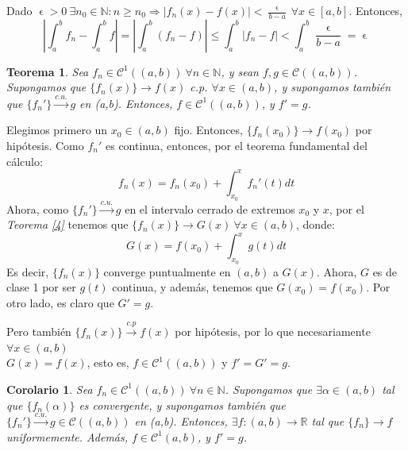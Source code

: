 \documentclass[11pt, a4paper]{article}
\makeatletter
\newif\IfInSansMode
\let\oldsf\sffamily
\renewcommand*{\sffamily}{\oldsf\mathversion{sans}\InSansModetrue}
\let\oldnorm\normalfont
\renewcommand*{\normalfont}{\oldnorm\InSansModefalse\mathversion{normal}}
\let\epsilon\upvarepsilon
\newcommand{\fn}{\{f_n\}}
\renewenvironment{proof}[1][\proofname] {\par\pushQED{\qed}\normalfont\topsep6\p@\@plus6\p@\relax\trivlist\item[\hskip\labelsep\itshape\sffamily#1\@addpunct{.}]\ignorespaces}{\popQED\endtrivlist\@endpefalse}
\theoremstyle{theorem-style}
\newtheorem{nth}{Teorema}[section]
\newtheorem{ncor}{Corolario}[section]
\theoremstyle{definition-style}
\theoremstyle{remark-style}
\theoremstyle{example-style}
\makeatother
\begin{document}
  \begin{proof} Dado $\displaystyle \epsilon >0\ \exists n_0 \in \mathbb{N}: n \ge n_0 \Rightarrow |f_n(x)-f(x)| < \frac{\epsilon}{b-a}\ \forall x \in [a,b]$. Entonces, $$\left| \int_a^b f_n - \int _a^b f \right| = \left| \int_a^b (f_n - f) \right| \le \int_a^b |f_n - f| < \int_a^b \frac{\epsilon}{b-a} = \epsilon$$
  \end{proof}

\begin{nth} \label{5}
  Sea $f_n\in \mathcal{C}^1((a,b)) \ \forall n \in \mathbb{N}$, y sean $f,g \in \mathcal{C}((a,b))$. Supongamos que $ \{f_n(x)\} \to f(x)$ c.p. $\forall x \in (a,b)$, y supongamos también que $\{f_n'\} \xrightarrow{c.u.} g $ en (a,b). Entonces, $f \in \mathcal{C}^1((a,b))$, y $f' = g$.
\end{nth}

  \begin{proof}
    Elegimos primero un $x_0 \in (a,b)$ fijo. Entonces, $\{f_n(x_0)\} \to f(x_0)$ por hipótesis.
    Como $f_n'$ es continua, entonces, por el teorema fundamental del cálculo:
    \[
      f_n(x) = f_n(x_0) + \int_{x_0}^x f_n'(t)dt
    \]
    Ahora, como  $\{f_n'\} \xrightarrow{c.u.} g $ en el intervalo cerrado de extremos $x_0$ y $x$, por el \textit{Teorema \ref{4}} tenemos que $\{f_n(x)\} \to G(x)\ \forall x \in (a,b)$, donde:
    \[
      G(x) = f(x_0) + \int_{x_0}^x g(t)dt
    \]
    Es decir, $\{f_n(x)\}$ converge puntualmente en $(a,b)$ a $G(x)$. Ahora, $G$ es de clase 1 por ser $g(t)$ continua, y además, tenemos que $G(x_0) = f(x_0)$.
    Por otro lado, es claro que $G' = g$.
    
    Pero también $\{f_n(x)\} \xrightarrow {c.p} f(x)$ por hipótesis, por lo que necesariamente $\forall x \in (a,b)$ \\ $G(x) = f(x)$, esto es, $f \in \mathcal{C}^1((a,b))$ y $f' = G' = g$.
  \end{proof}

\begin{ncor}
  Sea $f_n\in \mathcal{C}^1((a,b)) \ \forall n \in \mathbb{N}$. Supongamos que $\exists \alpha \in (a,b)$ tal que $ \{f_n(\alpha)\}$ es convergente, y supongamos también que $\{f_n'\} \xrightarrow{c.u.} g \in \mathcal C((a,b))$ en (a,b). Entonces, $\exists f: (a,b) \to \mathbb{R}$ tal que $\fn \to f$ uniformemente. Además, $f \in \mathcal{C}^1(a,b)$, y  $f' = g$.
\end{ncor}
\end{document}
